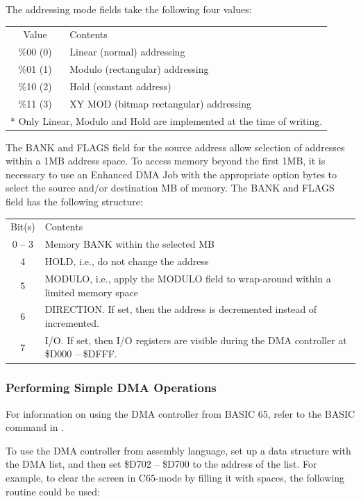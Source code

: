 The addressing mode fields take the following four values:

\begin{tabular}{|c|l|}
  \hline
  Value & Contents \\
  \%00 (0) & Linear (normal) addressing \\
  \%01 (1) & Modulo (rectangular) addressing \\
  \%10 (2) & Hold (constant address) \\
  \%11 (3) & XY MOD (bitmap rectangular) addressing \\
  \hline
  \multicolumn{2}{l}{* Only Linear, Modulo and Hold are implemented at the time of writing.}
\end{tabular}

The BANK and FLAGS field for the source address allow selection of addresses within a 1MB
address space. To access memory beyond the first 1MB, it is necessary to use an Enhanced DMA
Job with the appropriate option bytes to select the source and/or destination MB of memory.
The BANK and FLAGS field has the following structure:

\begin{tabular}{|c|l|}
  \hline
  Bit(s) & Contents \\
  0 -- 3 & Memory BANK within the selected MB \\
  4 & HOLD, i.e., do not change the address \\
  5 & MODULO, i.e., apply the MODULO field to wrap-around within a limited memory space \\
  6 & DIRECTION. If set, then the address is decremented instead of incremented. \\
  7 & I/O. If set, then I/O registers are visible during the DMA controller at \$D000 -- \$DFFF. \\
  \hline
\end{tabular}

\subsubsection{Performing Simple DMA Operations}

For information on using the DMA controller from BASIC 65, refer to the  BASIC command in .

To use the DMA controller from assembly language, set up a data structure with the DMA list, and then
set \$D702 -- \$D700 to the address of the list. For example, to clear the screen in C65-mode by filling
it with spaces, the following routine could be used:

